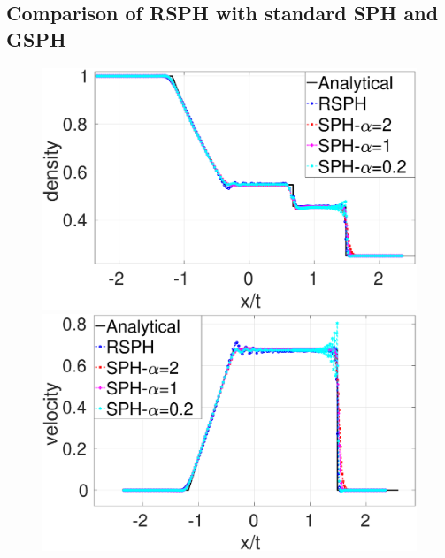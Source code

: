 \subsection{Comparison of RSPH with standard SPH and GSPH}
\begin{figure}[htp]
    \centering
    \begin{minipage}{.495\textwidth}
        \centering
        \includegraphics[width=0.99 \textwidth]{Chapter-4/Figures/Sod/RCM-Sod-SPH-alf-rho}
    \end{minipage}%
    \begin{minipage}{.495 \textwidth}
        \centering
        \includegraphics[width=0.99 \textwidth]{Chapter-4/Figures/Sod/RCM-Sod-SPH-alf-v}
    \end{minipage}%
    \\
    \begin{minipage}{.495\textwidth}
        \centering

\end{minipage}
\end{figure}
